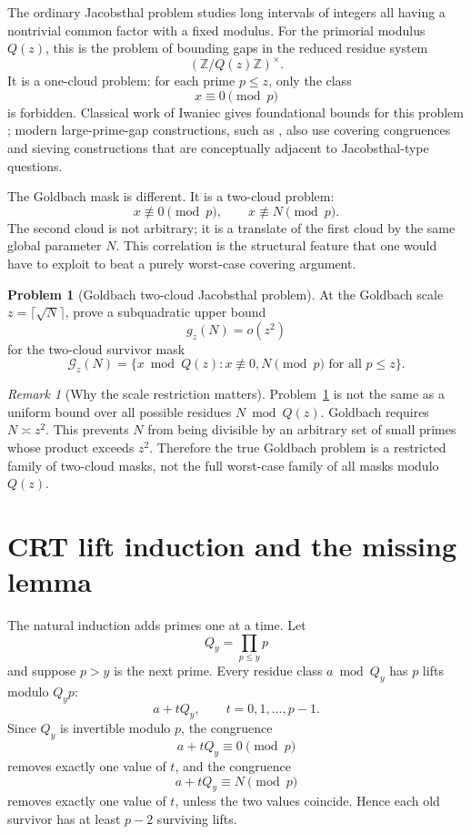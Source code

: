 \documentclass[11pt]{article}
\theoremstyle{plain}
\theoremstyle{definition}
\newtheorem{problem}[theorem]{Problem}
\theoremstyle{remark}
\newtheorem{remark}[theorem]{Remark}
\newcommand{\Z}{\mathbb Z}
\newcommand{\G}{\mathcal G}
\begin{document}
The ordinary Jacobsthal problem studies long intervals of integers all having a
nontrivial common factor with a fixed modulus.  For the primorial modulus
\(Q(z)\), this is the problem of bounding gaps in the reduced residue system
\[
(\Z/Q(z)\Z)^\times.
\]
It is a one-cloud problem: for each prime \(p\le z\), only the class
\[
x\equiv0\pmod p
\]
is forbidden.  Classical work of Iwaniec gives foundational bounds for this
problem \cite{Iwaniec1978}; modern large-prime-gap constructions, such as
\cite{FordGreenKonyaginTao2016,Maynard2016}, also use covering congruences and
sieving constructions that are conceptually adjacent to Jacobsthal-type
questions.

The Goldbach mask is different.  It is a two-cloud problem:
\[
x\not\equiv0\pmod p,
\qquad
x\not\equiv N\pmod p.
\]
The second cloud is not arbitrary; it is a translate of the first cloud by the
same global parameter \(N\).  This correlation is the structural feature that
one would have to exploit to beat a purely worst-case covering argument.

\begin{problem}[Goldbach two-cloud Jacobsthal problem]
\label{prob:two_cloud_jacobsthal}
At the Goldbach scale \(z=\lceil\sqrt N\rceil\), prove a subquadratic upper
bound
\[
g_z(N)=o(z^2)
\]
for the two-cloud survivor mask
\[
\G_z(N)=\{x\bmod Q(z):x\not\equiv0,N\pmod p\text{ for all }p\le z\}.
\]
\end{problem}

\begin{remark}[Why the scale restriction matters]
Problem~\ref{prob:two_cloud_jacobsthal} is not the same as a uniform bound over
all possible residues \(N\bmod Q(z)\).  Goldbach requires \(N\asymp z^2\).  This
prevents \(N\) from being divisible by an arbitrary set of small primes whose
product exceeds \(z^2\).  Therefore the true Goldbach problem is a restricted
family of two-cloud masks, not the full worst-case family of all masks modulo
\(Q(z)\).
\end{remark}

\section{CRT lift induction and the missing lemma}
\label{sec:crt_induction}

The natural induction adds primes one at a time.  Let
\[
Q_y=\prod_{p\le y}p
\]
and suppose \(p>y\) is the next prime.  Every residue class
\(a\bmod Q_y\) has \(p\) lifts modulo \(Q_y p\):
\[
a+tQ_y,
\qquad t=0,1,\dots,p-1.
\]
Since \(Q_y\) is invertible modulo \(p\), the congruence
\[
a+tQ_y\equiv0\pmod p
\]
removes exactly one value of \(t\), and the congruence
\[
a+tQ_y\equiv N\pmod p
\]
removes exactly one value of \(t\), unless the two values coincide.  Hence each
old survivor has at least \(p-2\) surviving lifts.
\end{document}
